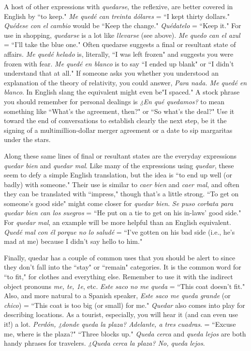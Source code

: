 A host of other expressions with \emph{quedarse}, the reflexive, are
better covered in English by ``to keep." \emph{Me quedé can treinta dólares}
= ``I kept thirty dollars." \emph{Quédese con el cambio} would be ``Keep the
change." \emph{Quédatelo} = ``Keep it." For use in shopping, \emph{quedarse} is a
lot like \emph{llevarse} (see above). \emph{Me quedo can el azul} = ``I'll take the blue
one." Often quedarse suggests a final or resultant state of affairs. \emph{Me
quedé helado} is, literally, ``I was left frozen" and suggests you were frozen with fear. \emph{Me quedé en blanco} is to say ``I ended up blank" or ``I
didn't understand that at all." If someone asks you whether you understood an explanation of the theory of relativity, you could answer, \emph{Para
nada. Me quedé en blanco}. In English slang the equivalent might
even be"I spaced." A stock phrase you should remember for personal
dealings is \emph{¿En qué quedamos?} to mean something like ``What's the
agreement, then?" or ``So what's the deal?" Use it toward the end of
conversations to establish clearly the next step, be it the signing of a
multimillion-dollar merger agreement or a date to sip margaritas under
the stars.

Along these same lines of final or resultant states are the everyday expressions \emph{quedar bien} and \emph{quedar mal}. Like many of the expressions using \emph{quedar}, these seem to defy a simple English translation,
but the idea is ``to end up well (or badly) with someone." Their use is
similar to \emph{caer bien} and \emph{caer mal}, and often they can be translated
with ``impress," though that's a little strong. ``To get on someone's
good side" might come closer for \emph{quedar bien}. \emph{Se puso corbata para
quedar bien can los suegros} = ``He put on a tie to get on his in-laws'
good side." For \emph{quedar mal}, an example will be more helpful than an
English equivalent. \emph{Quedé mal con él porque no lo saludé} = ``I've
gotten on his bad side (i.e., he's mad at me) because I didn't say hello
to him."

Finally, quedar has a couple of common uses that you should
be alert to since they don't fall into the ``stay" or ``remain" categories.
It is the common word for ``to fit," for clothes and everything else. Remember to use it with the indirect object pronouns \emph{me, te, 1e}, etc. \emph{Este
saco no me queda} = ``This coat doesn't fit." Also, and more natural to
a Spanish speaker, \emph{Este saco me queda grande} (or \emph{chico}) = ``This coat
is too big (or small) for me." \emph{Quedar} also comes into play for describing locations. As a tourist, especially, you will hear it (and can even
use it!) a lot. \emph{Perdón, ¿donde queda la plaza? Adelante, a tres cuadras}.
= ``Excuse me, where is the plaza?" ``Three blocks up." \emph{Queda cerca}
and \emph{queda lejos} are both handy phrases for travelers. \emph{¿Queda cerca la
plaza? No, queda lejos}.


